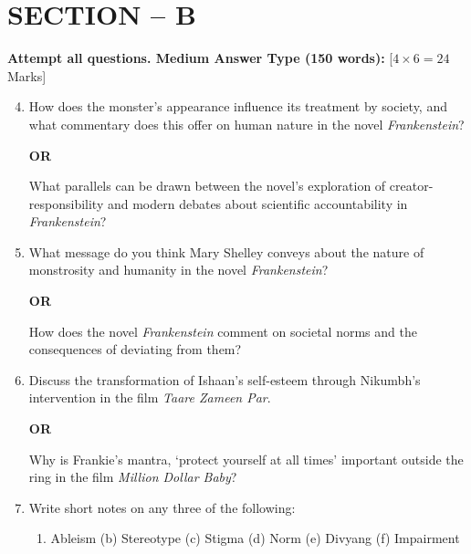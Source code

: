 \documentclass[11pt,a4paper]{article}
\begin{document}
\section*{SECTION -- B}



\noindent   \textbf{Attempt all questions. Medium Answer Type (150 words):} \hfill [$4  \times 6 = 24$ Marks]


\begin{enumerate}[label=   \textbf{\arabic*.}]
    \setcounter{enumii}{3}
    \item How does the monster's appearance influence its treatment by society, and what commentary does this offer on human nature in the novel   \textit{Frankenstein}?
    
\begin{center}   \textbf{OR}\end{center}
    What parallels can be drawn between the novel's exploration of creator-responsibility and modern debates about scientific accountability in   \textit{Frankenstein}?

    \item What message do you think Mary Shelley conveys about the nature of monstrosity and humanity in the novel   \textit{Frankenstein}?
    
\begin{center}   \textbf{OR}\end{center}
    How does the novel   \textit{Frankenstein} comment on societal norms and the consequences of deviating from them?

    \item Discuss the transformation of Ishaan's self-esteem through Nikumbh's intervention in the film   \textit{Taare Zameen Par}.
    
\begin{center}   \textbf{OR}\end{center}
    Why is Frankie's mantra, `protect yourself at all times' important outside the ring in the film   \textit{Million Dollar Baby}?

    \item Write short notes on any three of the following:
    
\begin{enumerate}[label=(\alph*)]
        \item Ableism \quad (b) Stereotype \quad (c) Stigma \quad (d) Norm \quad (e) Divyang \quad (f) Impairment
    \end{enumerate}
\end{enumerate}
\end{document}
